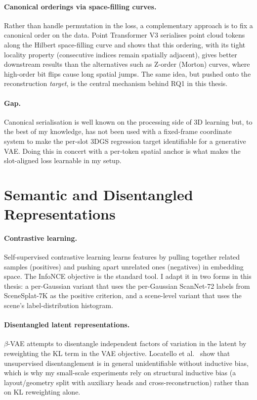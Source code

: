 \paragraph{Canonical orderings via space-filling curves.}
Rather than handle permutation in the loss, a complementary approach is to fix a canonical order on the data. Point Transformer V3 \citep{wu2024ptv3} serialises point cloud tokens along the Hilbert space-filling curve \citep{skilling2004hilbert} and shows that this ordering, with its tight locality property (consecutive indices remain spatially adjacent), gives better downstream results than the alternatives such as Z-order (Morton) curves, where high-order bit flips cause long spatial jumps. The same idea, but pushed onto the reconstruction \emph{target}, is the central mechanism behind RQ1 in this thesis.

\paragraph{Gap.} Canonical serialisation is well known on the processing side of 3D learning but, to the best of my knowledge, has not been used with a fixed-frame coordinate system to make the per-slot 3DGS regression target identifiable for a generative VAE. Doing this in concert with a per-token spatial anchor is what makes the slot-aligned loss learnable in my setup.

\section{Semantic and Disentangled Representations}
\label{sec:rw_sem}

\paragraph{Contrastive learning.}
Self-supervised contrastive learning \citep{oord2018cpc, chen2020simclr} learns features by pulling together related samples (positives) and pushing apart unrelated ones (negatives) in embedding space. The InfoNCE objective \citep{oord2018cpc} is the standard tool. I adapt it in two forms in this thesis: a per-Gaussian variant that uses the per-Gaussian ScanNet-72 labels from SceneSplat-7K as the positive criterion, and a scene-level variant that uses the scene's label-distribution histogram.

\paragraph{Disentangled latent representations.}
$\beta$-VAE \citep{higgins2017betavae} attempts to disentangle independent factors of variation in the latent by reweighting the KL term in the VAE objective. Locatello et al.\ \citep{locatello2019challenging} show that unsupervised disentanglement is in general unidentifiable without inductive bias, which is why my small-scale experiments rely on structural inductive bias (a layout/geometry split with auxiliary heads and cross-reconstruction) rather than on KL reweighting alone.

